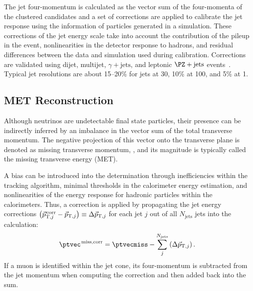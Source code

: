 The jet four-momentum is calculated as the vector sum of the four-momenta of the clustered candidates and a set of corrections are applied to calibrate the jet response using the information of particles generated in a simulation.
These corrections of the jet energy scale take into account the contribution of the pileup in the event, nonlinearities in the detector response to hadrons, and residual differences between the data and simulation used during calibration.
Corrections are validated using dijet, multijet, $\gamma + \text{jets}$, and leptonic $\PZ + \text{jets}$ events~\cite{CMS:2016lmd}.
Typical jet resolutions are about 15--20\% for jets at 30\GeV, 10\% at 100\GeV, and 5\% at 1\TeV.

\subsection{MET Reconstruction}
\label{sec:met_reco}
Although neutrinos are undetectable final state particles, their presence can be indirectly inferred by an imbalance in the vector sum of the total transverse momentum.
The negative projection of this vector onto the transverse plane is denoted as missing transverse momentum, \ptvecmiss, and its magnitude is typically called the missing transverse energy (MET).

A bias can be introduced into the \ptvecmiss determination through inefficiencies within the tracking algorithm, minimal thresholds in the calorimeter energy estimation, and nonlinearities of the energy response for hadronic particles within the calorimeters.
Thus, a correction is applied by propagating the jet energy corrections $\left( \vec{p}_{\text{T}, j}^{\kern1pt \text{corr}} - \vec{p}_{\text{T}, j} \right) \equiv \Delta \vec{p}_{\text{T}, j}$ for each jet $j$ out of all $N_\text{jets}$ jets into the calculation:
\begin{equation}
\ptvec^{\kern1pt \text{miss,corr}} =
    \ptvecmiss - \sum^{N_\text{jets}}_{j}
        \left( \Delta \vec{p}_{\text{T}, j} \right).
\end{equation}
If a muon is identified within the jet cone, its four-momentum is subtracted from the jet momentum when computing the correction and then added back into the \ptvecmiss sum.